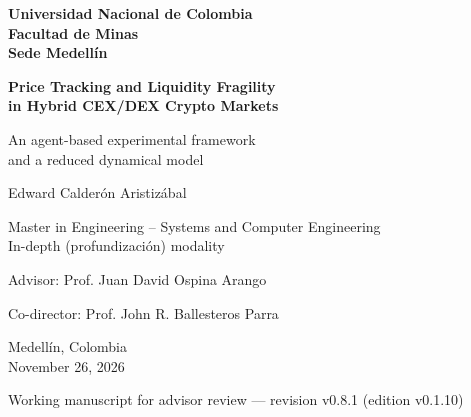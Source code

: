 \documentclass[11pt,letterpaper]{report}
\newcommand{\versionTesis}{v0.1.10}
\newcommand{\revisionManuscrito}{v0.8.1}
\numberwithin{equation}{chapter}
\begin{document}
\begin{titlepage}
  \thispagestyle{empty}
  \centering
  \singlespacing
  {\large\bfseries Universidad Nacional de Colombia\\[2pt]
  Facultad de Minas\\[2pt]
  Sede Medellín\par}
  \vspace{3.2cm}
  {\LARGE\bfseries Price Tracking and Liquidity Fragility\\
  in Hybrid CEX/DEX Crypto Markets\par}
  \vspace{0.9cm}
  {\Large An agent-based experimental framework\\
  and a reduced dynamical model\par}
  \vspace{2.6cm}
  {\Large Edward Calderón Aristizábal\par}
  \vspace{1.6cm}
  {\large Master in Engineering -- Systems and Computer Engineering\\[2pt]
  In-depth (profundización) modality\par}
  \vspace{0.8cm}
  {\large Advisor: Prof. Juan David Ospina Arango\par}
  {\large Co-director: Prof. John R. Ballesteros Parra\par}
  \vfill
  {\large Medellín, Colombia\\[2pt]
  November 26, 2026\par}
  \vspace{0.3cm}
  {\small Working manuscript for advisor review --- revision \revisionManuscrito{} (edition \versionTesis{})\par}
\end{titlepage}

\setcounter{page}{1}

\begingroup
\setcounter{secnumdepth}{-1}
\titleformat{\section}{\Large\bfseries}{}{0pt}{}
\singlespacing

\clearpage

\endgroup
\setcounter{secnumdepth}{2}
\end{document}
